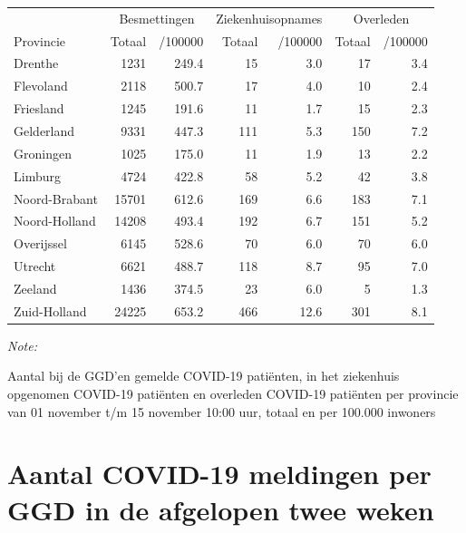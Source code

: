 \documentclass[
  english,
  man,floatsintext]{apa6}
\begin{document}
\begin{table}[H]
\centering
\begin{threeparttable}
\begin{tabular}{lrrrrrr}
\toprule
\multicolumn{1}{c}{ } & \multicolumn{2}{c}{Besmettingen} & \multicolumn{2}{c}{Ziekenhuisopnames} & \multicolumn{2}{c}{Overleden} \\
\cmidrule(l{3pt}r{3pt}){2-3} \cmidrule(l{3pt}r{3pt}){4-5} \cmidrule(l{3pt}r{3pt}){6-7}
Provincie & Totaal & /100000 & Totaal & /100000 & Totaal & /100000\\
\midrule
Drenthe & 1231 & 249.4 & 15 & 3.0 & 17 & 3.4\\
Flevoland & 2118 & 500.7 & 17 & 4.0 & 10 & 2.4\\
Friesland & 1245 & 191.6 & 11 & 1.7 & 15 & 2.3\\
Gelderland & 9331 & 447.3 & 111 & 5.3 & 150 & 7.2\\
Groningen & 1025 & 175.0 & 11 & 1.9 & 13 & 2.2\\
Limburg & 4724 & 422.8 & 58 & 5.2 & 42 & 3.8\\
Noord-Brabant & 15701 & 612.6 & 169 & 6.6 & 183 & 7.1\\
Noord-Holland & 14208 & 493.4 & 192 & 6.7 & 151 & 5.2\\
Overijssel & 6145 & 528.6 & 70 & 6.0 & 70 & 6.0\\
Utrecht & 6621 & 488.7 & 118 & 8.7 & 95 & 7.0\\
Zeeland & 1436 & 374.5 & 23 & 6.0 & 5 & 1.3\\
Zuid-Holland & 24225 & 653.2 & 466 & 12.6 & 301 & 8.1\\
\bottomrule
\end{tabular}
\begin{tablenotes}
\item \textit{Note: } 
\item Aantal bij de GGD’en gemelde COVID-19 patiënten, in het ziekenhuis opgenomen COVID-19 patiënten en overleden COVID-19 patiënten per provincie van 01 november t/m 15 november 10:00 uur, totaal en per 100.000 inwoners
\end{tablenotes}
\end{threeparttable}
\end{table}

\newpage

\hypertarget{aantal-covid-19-meldingen-per-ggd-in-de-afgelopen-twee-weken}{%
\section{Aantal COVID-19 meldingen per GGD in de afgelopen twee weken}\label{aantal-covid-19-meldingen-per-ggd-in-de-afgelopen-twee-weken}}
\end{document}
